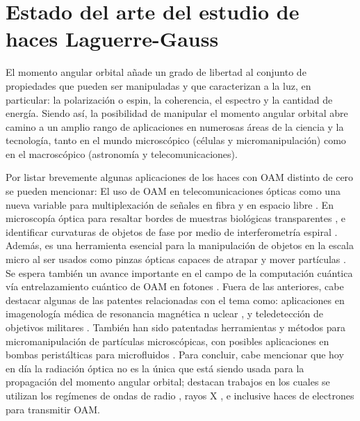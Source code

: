 \section{Estado del arte del estudio de haces Laguerre-Gauss\label{sec:estadoArte}}

El momento angular orbital añade un grado de libertad al
conjunto de propiedades que pueden ser manipuladas y que caracterizan
a la luz, en particular: la polarización o espin, la coherencia, el
espectro y la cantidad de energía. Siendo así, la posibilidad de manipular el
momento angular orbital abre camino a un amplio rango de aplicaciones
en numerosas áreas de la ciencia y la tecnología, tanto en el mundo
microscópico (células y micromanipulación) como en el macroscópico
(astronomía y telecomunicaciones).  

Por listar brevemente algunas aplicaciones de los haces
con OAM distinto de cero se pueden mencionar: El uso de OAM en
telecomunicaciones ópticas como una nueva variable para 
multiplexación de señales en fibra y en espacio libre 
. En microscopía
óptica para resaltar bordes de muestras biológicas transparentes , e identificar
curvaturas de objetos de fase por medio de interferometría espiral
. Además, es una herramienta esencial para la
manipulación de objetos en la escala micro al ser usados como pinzas ópticas capaces
de atrapar y mover partículas . Se espera también
un avance importante en el campo de la computación cuántica vía
entrelazamiento cuántico de OAM en fotones . Fuera de
las anteriores, cabe destacar algunas de las patentes relacionadas
con el tema como: aplicaciones en imagenología médica de resonancia magnética
n uclear , y teledetección de objetivos militares
. También han sido patentadas herramientas y métodos
para micromanipulación de partículas microscópicas, con
posibles aplicaciones en bombas peristálticas para microfluidos
. Para concluir, cabe mencionar  que hoy
en día la radiación óptica no es la única que está siendo usada  
para la propagación del momento angular orbital; destacan trabajos en
los cuales se utilizan los regímenes de ondas de radio
, rayos X , e inclusive haces de
electrones  para transmitir OAM. \\

